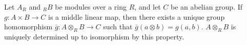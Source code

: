 Let $A_R$ and ${}_R B$ be modules over a ring $R$, and let $C$ be an abelian group. If $g : A \times B \to C$ is a middle linear map, then there exists a unique group homomorphism $\bar{g} : A \otimes_R B \to C$ such that $\bar{g}(a \otimes b) = g(a,b)$. $A \otimes_R B$ is uniquely determined up to isomorphism by this property.
